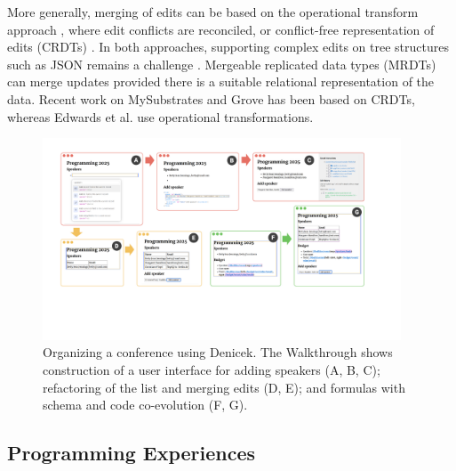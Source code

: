 \documentclass[sigconf,anonymous,screen]{acmart}
\begin{document}
More generally, merging of edits can be based on the operational transform approach
\cite{davis-2002-otsgml}, where edit conflicts are reconciled,
or conflict-free representation of edits (CRDTs) \cite{kleppmann-2019-local,litt-2022-peritext}.
In both approaches, supporting complex edits on tree structures such as JSON
remains a challenge \cite{jungnickel-2016-otjson,da-2024-jsoncrdt}. Mergeable replicated data
types (MRDTs) \cite{kaki-2019-mrdts} can merge updates provided there is a suitable relational
representation of the data. Recent work on MySubstrates and Grove \cite{adams-2025-grove,klokmose-2024-mywebstrates}
has been based on CRDTs, whereas Edwards et al. \cite{edwards-2021-typed} use operational
transformations.


\begin{figure}[t]
\vspace{-0.5em}
\includegraphics[width=0.95\textwidth,clip,trim=1.7cm 4.9cm 3.2cm 1.2cm]{fig/walkthrough.pdf}
\vspace{-0.5em}
\caption{Organizing a conference using Denicek. The Walkthrough shows construction of a user
  interface for adding speakers (A, B, C); refactoring of the list and merging edits (D, E); and
  formulas with schema and code co-evolution (F, G).}
\label{fig:walkthrough}
\end{figure}


\subsection{Programming Experiences}
\label{sec:background-exp}
\end{document}
